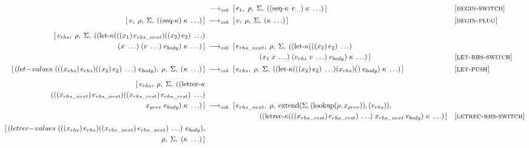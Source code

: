 \begin{figure}[!h]
{\begin{minipage}{\textwidth}
\begin{align*}
        &\;\longrightarrow_{\textit{cek}}\;
        [\,e_1,\;\rho,\;\Sigma,\;((\operatorname{seq-\kappa}\;e_{\ldots})\;\kappa\;\ldots)\,]
        &&\textsc{[begin‑switch]}\\[2pt]
%
        [\,v,\;\rho,\;\Sigma,\;((\operatorname{seq-\kappa})\;\kappa\;\ldots)\,]
        &\;\longrightarrow_{\textit{cek}}\;
        [\,v,\;\rho,\;\Sigma,\;(\kappa\;\ldots)\,]
        &&\textsc{[begin‑plug]}\\[6pt]
%
        [\,v_{rhs},\;\rho,\;\Sigma,\;((\operatorname{let-\kappa}(((x_1)\,e_{rhs\_next})((x_2)\,e_2)\;\ldots)\\(x\;\ldots)\;(v\;\ldots)\;e_{body})\;\kappa\;\ldots)\,]
        &\;\longrightarrow_{\textit{cek}}\;
        [\,e_{rhs\_next},\;\rho,\;\Sigma,\;((\operatorname{let-\kappa}(((x_2)\,e_2)\;\ldots)\\
        &\hspace{7.6em}
          (x_1\;x\;\ldots)\;(v_{rhs}\;v\;\ldots)\;e_{body})\;\kappa\;\ldots)\,]
        &&\textsc{[let‑rhs‑switch]}\\[2pt]
%
        [\,(let\!-\!values\ (((x_{rhs})\,e_{rhs})((x_2)\,e_2)\;\ldots)\ e_{body}),\;\rho,\;\Sigma,\;(\kappa\;\ldots)\,]
        &\;\longrightarrow_{\textit{cek}}\;
        [\,e_{rhs},\;\rho,\;\Sigma,\;((\operatorname{let-\kappa}(((x_2)\,e_2)\;\ldots)(x_{rhs})()\;e_{body})\;\kappa\;\ldots)\,]
        &&\textsc{[let‑push]}\\[6pt]
%
        [\,v_{rhs},\;\rho,\;\Sigma,\;((\operatorname{letrec-\kappa}\\(((x_{rhs\_next})\,e_{rhs\_next})((x_{rhs\_rest})\,e_{rhs\_rest})\;\ldots)\\
                                       x_{prev}\;e_{body})\;\kappa\;\ldots)\,]
        &\;\longrightarrow_{\textit{cek}}\;
        [\,e_{rhs\_next},\;\rho,\;\operatorname{extend}(\Sigma,(\operatorname{lookup}(\rho,x_{prev})),(v_{rhs})),\\
        &\hspace{7.6em}
          ((\operatorname{letrec-\kappa}(((x_{rhs\_rest})\,e_{rhs\_rest})\;\ldots)\;x_{rhs\_next}\;e_{body})\;\kappa\;\ldots)\,]
        &&\textsc{[letrec‑rhs‑switch]}\\[2pt]
%
        [\,(letrec\!-\!values\ (((x_{rhs})\,e_{rhs})((x_{rhs\_next})\,e_{rhs\_next})\;\ldots)\ e_{body}),\\ \rho,\;\Sigma,\;(\kappa\;\ldots)\,]

\end{align*}
\end{minipage}}
\end{figure}
